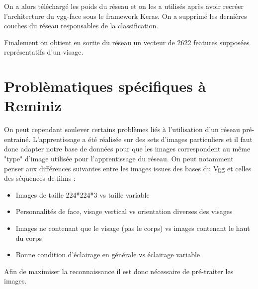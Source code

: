 \documentclass[12pt,french]{report}
\begin{document}
On a alors téléchargé les poids du réseau et on les a utilisés après avoir recréer l'architecture du vgg-face sous le framework Keras.
On a supprimé les dernières couches du réseau responsables de la classification.

Finalement on obtient en sortie du réseau un vecteur de 2622 features supposées représentatifs d'un visage.

\section{Problèmatiques spécifiques à Reminiz}
On peut cependant soulever certains problèmes liés à l'utilisation d'un réseau pré-entrainé.
L'apprentissage a été réalisée sur des sets d'images  particuliers et il faut donc adapter notre base de données pour que les images correspondent au même "type" d'image utilisée pour l'apprentissage du réseau.
On peut notamment penser aux différences suivantes entre les images issues des bases du Vgg et celles des séquences de films :
\begin{itemize}
	\item Images de taille 224*224*3 vs taille  variable
	\item Personnalités de face, visage vertical vs orientation diverses des visages
	\item Images ne contenant que le visage (pas le corps) vs images contenant le haut du corps
	\item Bonne condition d’éclairage en générale vs éclairage variable

\end{itemize}

Afin de maximiser la reconnaissance il est donc nécessaire de pré-traiter les images.
\end{document}
